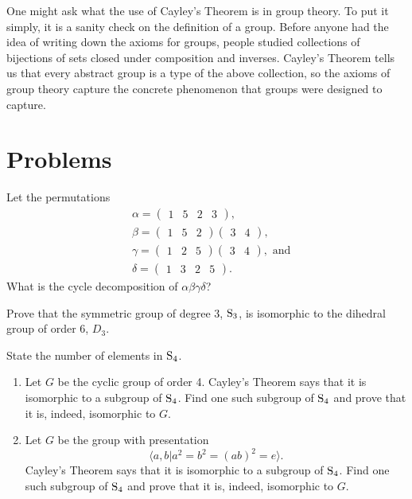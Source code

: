 One might ask what the use of Cayley's Theorem is in group theory. To put it simply, it is a sanity check on the definition of a group. Before anyone had the idea of writing down the axioms for groups, people studied collections of bijections of sets closed under composition and inverses. Cayley's Theorem tells us that every abstract group is a type of the above collection, so the axioms of group theory capture the concrete phenomenon that groups were designed to capture.

\newpage

\section{Problems}
\begin{problem}
    Let the permutations
    \begin{align*}
        &\alpha = \begin{pmatrix}1 & 5 & 2 & 3\end{pmatrix},\\
        &\beta  = \begin{pmatrix}1 & 5 & 2\end{pmatrix}\begin{pmatrix}3 & 4\end{pmatrix},\\
        &\gamma = \begin{pmatrix}1 & 2 & 5\end{pmatrix}\begin{pmatrix}3 & 4\end{pmatrix}, \text{ and}\\
        &\delta = \begin{pmatrix}1 & 3 & 2 & 5\end{pmatrix}.
    \end{align*}
    What is the cycle decomposition of $\alpha\beta\gamma\delta$?
\end{problem}

\begin{problem}
    Prove that the symmetric group of degree 3, $\mathrm{S}_{3}$, is isomorphic to the dihedral group of order 6, $D_3$.
\end{problem}

\begin{problem}
    State the number of elements in $\mathrm{S}_{4}$.
    \begin{enumerate}[label=(\alph*)]
        \item Let $G$ be the cyclic group of order 4. Cayley's Theorem says that it is isomorphic to a subgroup of $\mathrm{S}_{4}$. Find one such subgroup of $\mathrm{S}_{4}$ and prove that it is, indeed, isomorphic to $G$.
        \item Let $G$ be the group with presentation
        \[
            \langle a, b \vert a^2 = b^2 = (ab)^2 = e \rangle.
        \]
        Cayley's Theorem says that it is isomorphic to a subgroup of $\mathrm{S}_{4}$. Find one such subgroup of $\mathrm{S}_{4}$ and prove that it is, indeed, isomorphic to $G$.
    \end{enumerate}
\end{problem}

